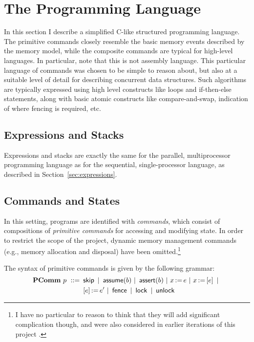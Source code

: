 \documentclass[11pt]{report}
\begin{document}
\section{The Programming Language}
\label{sec:programming-language}

In this section I describe a simplified C-like structured programming language. The primitive commands closely resemble the basic memory events described by the memory model, while the composite commands are typical for high-level languages. In particular, note that this is not assembly language. This particular language of commands was chosen to be simple to reason about, but also at a suitable level of detail for describing concurrent data structures. Such algorithms are typically expressed using high level constructs like loops and if-then-else statements, along with basic atomic constructs like compare-and-swap, indication of where fencing is required, etc. 

\subsection{Expressions and Stacks}

Expressions and stacks are exactly the same for the parallel, multiprocessor programming language as for the sequential, single-processor language, as described in Section~\ref{sec:expressions}. 

\subsection{Commands and States}
\label{sec:commands-and-states}

In this setting, programs are identified with \emph{commands}, which consist of compositions of \emph{primitive commands} for accessing and modifying state. In order to restrict the scope of the project, dynamic memory management commands (e.g., memory allocation and disposal) have been omitted.\footnote{I have no particular to reason to think that they will add significant complication though, and were also considered in earlier iterations of this project \cite{wmsldetails,lola11}.}

The syntax of primitive commands is given by the following grammar: \begin{align*} \mathbf{PComm}~p ~::=~ & \operatorname{\mathsf{skip}} ~|~ \operatorname{\mathsf{assume}}(b) ~|~ \operatorname{\mathsf{assert}}(b) ~|~ x \operatorname{:\!=} e ~|~ x \operatorname{:\!=} \left[ e \right] ~|~ \\ 
	& \left[ e \right] \operatorname{:\!=} e' ~|~ \operatorname{\mathsf{fence}} ~|~ \operatorname{\mathsf{lock}} ~|~ \operatorname{\mathsf{unlock}} 	
\end{align*}
\end{document}
